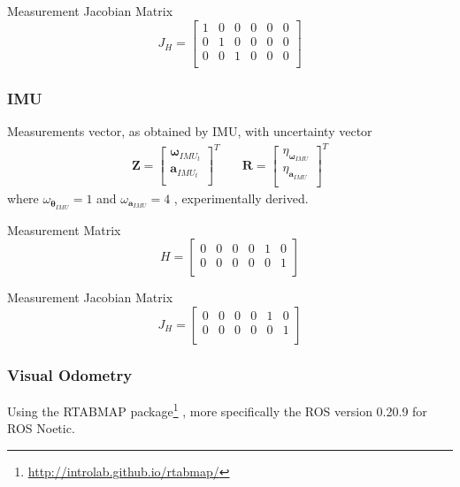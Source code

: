 Measurement Jacobian Matrix
\begin{equation}
J_H
=
\begin{bmatrix}
1 & 0 & 0 & 0 & 0 & 0 \\
0 & 1 & 0 & 0 & 0 & 0 \\
0 & 0 & 1 & 0 & 0 & 0 \\
\end{bmatrix}
\end{equation}



\subsubsection{IMU}

\noindent
Measurements vector, as obtained by IMU, with uncertainty vector
\begin{align}
\mathbf{Z}
=
\begin{bmatrix}
\boldsymbol \omega_{IMU_t} \\
\mathbf{a}_{IMU_t} \\
\end{bmatrix}^T
& \quad
\mathbf{R}
=
\begin{bmatrix}
\eta_{\boldsymbol \omega_{IMU}} \\
\eta_{\mathbf{a}_{IMU}} \\
\end{bmatrix}^T
\end{align}
where $ \omega_{\dot{\boldsymbol \theta}_{IMU}} = 1$ and
$ \omega_{\mathbf{a}_{IMU}} = 4 $ , experimentally derived.


Measurement Matrix
\begin{equation}
H
=
\begin{bmatrix}
0 & 0 & 0 & 0 & 1 & 0 \\
0 & 0 & 0 & 0 & 0 & 1 \\
\end{bmatrix}
\end{equation}

Measurement Jacobian Matrix
\begin{equation}
J_H
=
\begin{bmatrix}
0 & 0 & 0 & 0 & 1 & 0 \\
0 & 0 & 0 & 0 & 0 & 1 \\
\end{bmatrix}
\end{equation}

\subsubsection{Visual Odometry}
\noindent Using the \gls{RTABMAP} package\footnote{\url{http://introlab.github.io/rtabmap/}}\cite{6094602} \cite{labbe_rtab-map_2019}, more specifically the \gls{ROS} version 0.20.9 for \gls{ROS} Noetic.

